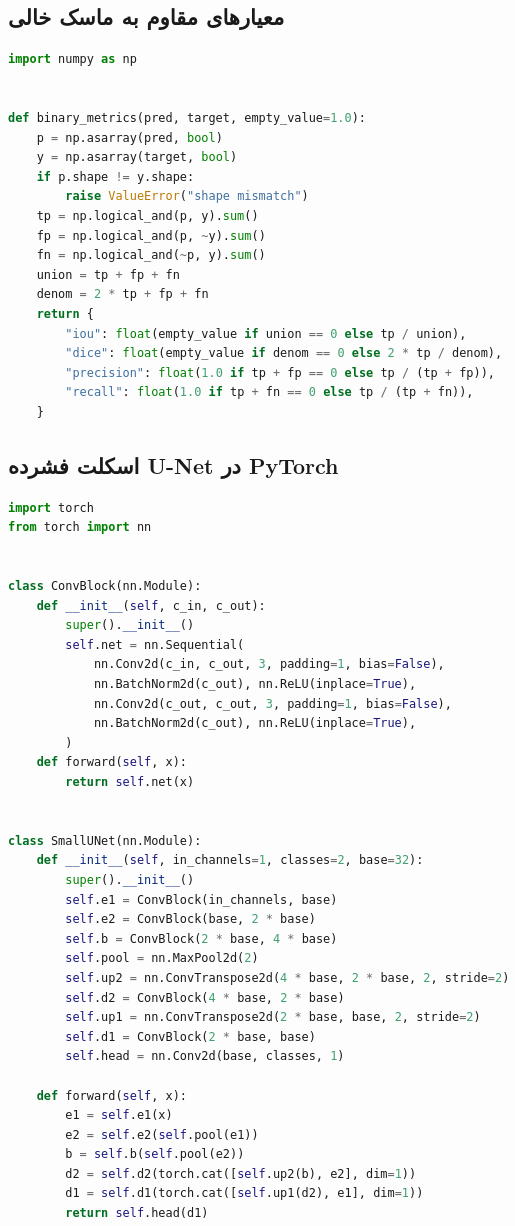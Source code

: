 \documentclass[12pt,openany,oneside]{book}
\begin{document}
\subsection{معیارهای مقاوم به ماسک خالی}
\begin{latin}
\begin{lstlisting}[language=Python]
import numpy as np


def binary_metrics(pred, target, empty_value=1.0):
    p = np.asarray(pred, bool)
    y = np.asarray(target, bool)
    if p.shape != y.shape:
        raise ValueError("shape mismatch")
    tp = np.logical_and(p, y).sum()
    fp = np.logical_and(p, ~y).sum()
    fn = np.logical_and(~p, y).sum()
    union = tp + fp + fn
    denom = 2 * tp + fp + fn
    return {
        "iou": float(empty_value if union == 0 else tp / union),
        "dice": float(empty_value if denom == 0 else 2 * tp / denom),
        "precision": float(1.0 if tp + fp == 0 else tp / (tp + fp)),
        "recall": float(1.0 if tp + fn == 0 else tp / (tp + fn)),
    }
\end{lstlisting}
\end{latin}

\subsection{اسکلت فشرده U-Net در PyTorch}
\begin{latin}
\begin{lstlisting}[language=Python]
import torch
from torch import nn


class ConvBlock(nn.Module):
    def __init__(self, c_in, c_out):
        super().__init__()
        self.net = nn.Sequential(
            nn.Conv2d(c_in, c_out, 3, padding=1, bias=False),
            nn.BatchNorm2d(c_out), nn.ReLU(inplace=True),
            nn.Conv2d(c_out, c_out, 3, padding=1, bias=False),
            nn.BatchNorm2d(c_out), nn.ReLU(inplace=True),
        )
    def forward(self, x):
        return self.net(x)


class SmallUNet(nn.Module):
    def __init__(self, in_channels=1, classes=2, base=32):
        super().__init__()
        self.e1 = ConvBlock(in_channels, base)
        self.e2 = ConvBlock(base, 2 * base)
        self.b = ConvBlock(2 * base, 4 * base)
        self.pool = nn.MaxPool2d(2)
        self.up2 = nn.ConvTranspose2d(4 * base, 2 * base, 2, stride=2)
        self.d2 = ConvBlock(4 * base, 2 * base)
        self.up1 = nn.ConvTranspose2d(2 * base, base, 2, stride=2)
        self.d1 = ConvBlock(2 * base, base)
        self.head = nn.Conv2d(base, classes, 1)

    def forward(self, x):
        e1 = self.e1(x)
        e2 = self.e2(self.pool(e1))
        b = self.b(self.pool(e2))
        d2 = self.d2(torch.cat([self.up2(b), e2], dim=1))
        d1 = self.d1(torch.cat([self.up1(d2), e1], dim=1))
        return self.head(d1)
\end{lstlisting}
\end{latin}
\end{document}
